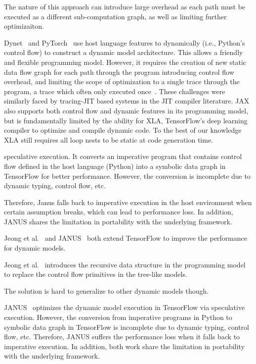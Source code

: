      The nature of this approach can introduce large overhead as each path must
     be executed as a different sub-computation graph, as well as limiting further optimizaiton.

    Dynet~\citep{neubig2017dynet} and PyTorch~\citep{pytorch} use host language features
    to dynamically (i.e., Python's control flow) to construct a dynamic model architecture.
    This allows a friendly and flexible programming model.
    However, it requires the creation of new static data flow graph for each path through
    the program introducing control flow overhead, and limiting the scope of optimization
    to a single trace through the program, a trace which often only executed once~\citep{xu2018cavs}. These challenges were similarly faced by tracing-JIT based systems in the JIT compiler literature. JAX~\citep{jax2018github} also supports both control flow and dynamic features in its programming model, but is fundamentally limited by the ability for XLA, TensorFlow's deep learning compiler to optimize and compile dynamic code. To the best of our knowledge XLA still requires all loop nests to be static at code generation time.

    speculative execution. It converts an imperative program that contains control
    flow defined in the host language (Python) into a symbolic data graph in
     TensorFlow for better performance. However, the conversion is incomplete
     due to dynamic typing, control flow, etc.

    Therefore, Janus falls back to imperative execution in
    the host environment when certain assumption breaks, which can
    lead to performance loss. In addition, JANUS shares the limitation in
    portability with the underlying framework.

    Jeong et al.~\citep{jeong2018improving} and JANUS~\citep{jeong2019janus}
     both extend TensorFlow to improve the performance for dynamic models.

     Jeong et al.~\citep{jeong2018improving} introduces the recursive data structure
     in the programming model to replace the control flow primitives in the tree-like models.

     The solution is hard to generalize to other dynamic models though.

     JANUS~\citep{jeong2019janus} optimizes the dynamic model execution in
     TensorFlow via speculative execution. However, the conversion from imperative programs
     in Python to symbolic data graph in TensorFlow is incomplete due to dynamic typing,
     control flow, etc. Therefore, JANUS suffers the performance loss when it
     falls back to imperative execution. In addition, both work share the limitation
     in portability with the underlying framework.

